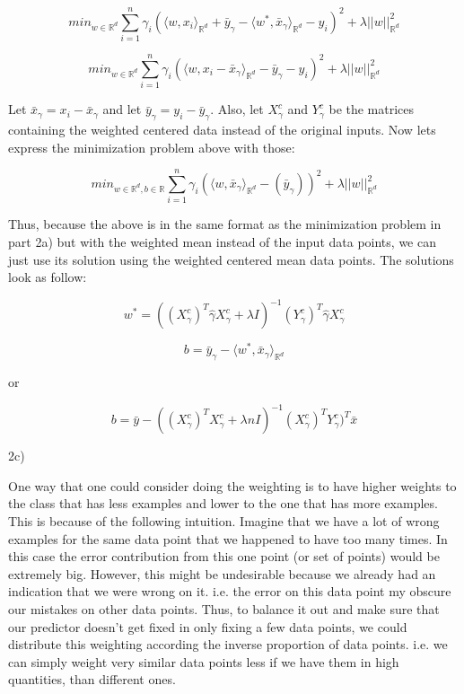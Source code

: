 \documentclass[12pt]{report}
\begin{document}
$$min_{w \in \mathbb{R}^d } \sum_{i=1}^{n}\gamma_i ( \langle w, x_i\rangle_{\mathbb{R}^d} + \bar{y}_\gamma -\langle w^*, \bar{x}_{\gamma} \rangle_{\mathbb{R}^d} - y_i)^2 + \lambda ||w||_{\mathbb{R}^d}^2$$

$$min_{w \in \mathbb{R}^d } \sum_{i=1}^{n}\gamma_i ( \langle w, x_i - \bar{x}_{\gamma}\rangle_{\mathbb{R}^d}  - \bar{y}_\gamma - y_i )^2 + \lambda ||w||_{\mathbb{R}^d}^2$$

Let $\bar{x}_{\gamma} = x_i - \bar{x}_{\gamma}$ and let $\bar{y}_{\gamma} = y_i - \bar{y}_{\gamma}$. Also, let $X^{c}_{\gamma}$ and $Y^{c}_{\gamma}$ be the matrices containing the weighted centered data instead of the original inputs. Now lets express the minimization problem above with those:

$$min_{w \in \mathbb{R}^d, b \in \mathbb{R}} \sum_{i=1}^{n} \gamma_i ( \langle w, \bar{x}_{\gamma}\rangle_{\mathbb{R}^d}  - (\bar{y}_{\gamma}) )^2 + \lambda ||w||_{\mathbb{R}^d}^2$$

Thus, because the above is in the same format as the minimization problem in part 2a) but with the weighted mean instead of the input data points, we can just use its solution using the weighted centered mean data points. The solutions look as follow:

$$ w^* = ((X^c_{\gamma})^T \hat{\gamma} X^c_{\gamma} + \lambda I)^{-1}(Y^c_{\gamma})^T  \hat{\gamma}  X^c_{\gamma} $$

$$b= \bar{y}_\gamma -\langle w^*, \bar{x}_{\gamma} \rangle_{\mathbb{R}^d}$$

or 

$$b= \bar{y} -((X^c_{\gamma})^TX^c_{\gamma} + \lambda n I)^{-1}(X^c_{\gamma})^TY^c_{\gamma})^T \bar{x}$$

2c)

One way that one could consider doing the weighting is to have higher weights to the class that has less examples and lower to the one that has more examples.
This is because of the following intuition. Imagine that we have a lot of wrong examples for the same data point that we happened to have too many times.
In this case the error contribution from this one point (or set of points) would be extremely big. 
However, this might be undesirable because we already had an indication that we were wrong on it. i.e. the error on this data point my obscure our mistakes on other data points.
Thus, to balance it out and make sure that our predictor doesn't get fixed in only fixing a few data points, we could distribute this weighting according the inverse proportion of data points.
i.e. we can simply weight very similar data points less if we have them in high quantities, than different ones.
\end{document}
